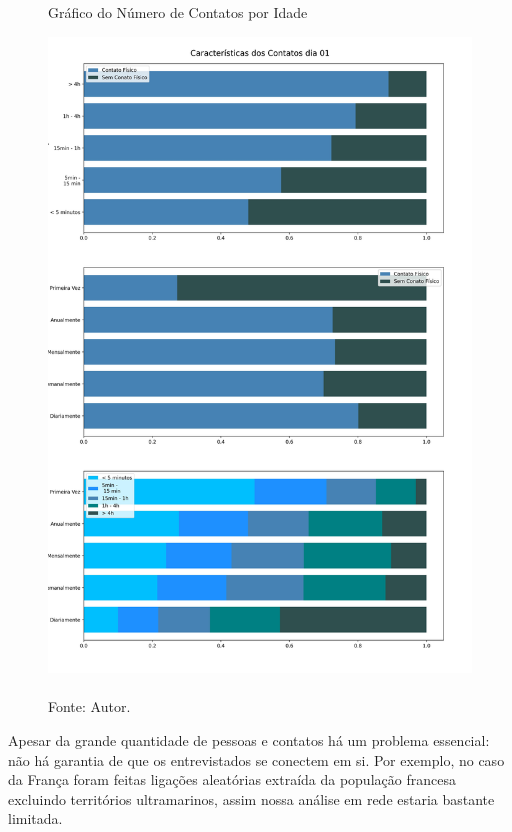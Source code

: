 \begin{figure}[H]
  \centering
  \captionsetup{font=normalsize,skip=1pt,singlelinecheck=on,labelsep=endash}

  \caption{Gráfico do Número de Contatos por Idade}

  \includegraphics[scale=0.5]{./img/contatos01.jpg}
  \captionsetup{font=small,position=below,skip=-1pt}
   \caption*{\\Fonte: Autor.}
   \label{características}
\end{figure}

Apesar da grande quantidade de pessoas e contatos há um problema essencial: não há garantia de que os entrevistados se conectem em si. Por exemplo, no caso da França \cite{France} foram feitas ligações aleatórias extraída da população francesa excluindo territórios ultramarinos, assim nossa análise em rede estaria bastante limitada.

